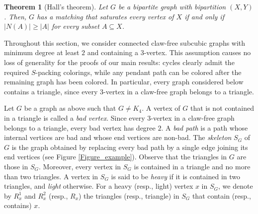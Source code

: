 \documentclass[12pt, oneside]{scrartcl}
\newtheorem{theorem}{Theorem}%
\begin{document}
\begin{theorem}[Hall's theorem]\label{t2}
Let $G$ be a bipartite graph with bipartition $(X,Y)$. Then, $G$ has a matching that saturates every vertex of $X$ if and only if
$|N(A)|\ge |A|$ for every subset $A\subseteq X$.
\end{theorem}

Throughout this section, we consider connected claw-free subcubic graphs with minimum degree at least $2$ and containing a $3$-vertex. This assumption causes no loss of generality for the proofs of our main results: cycles clearly admit the required $S$-packing colorings, while any pendant path can be colored after the remaining graph has been colored. In particular, every graph considered below contains a triangle, since every $3$-vertex in a claw-free graph belongs to a triangle.

Let $G$ be a graph as above such that $G\neq K_4$. A vertex of $G$ that is not contained in a triangle is called a \textit{bad vertex}. Since every $3$-vertex in a claw-free graph belongs to a triangle, every bad vertex has degree $2$. A \textit{bad path} is a path whose internal vertices are bad and whose end vertices are non-bad. The \textit{skeleton} $S_G$ of $G$ is the graph obtained by replacing every bad path by a single edge joining its end vertices (see Figure \ref{Figure_example}). Observe that the triangles in $G$ are those in $S_G$. Moreover, every vertex in $S_G$ is contained in a triangle and no more than two triangles. A vertex in $S_G$ is said to be \textit{heavy} if it is contained in two triangles, and \textit{light} otherwise. For a heavy (resp., light) vertex $x$ in $S_G$, we denote by $R_x^1$ and $R_x^2$ (resp., $R_x$) the triangles (resp., triangle) in $S_G$ that contain (resp., contains) $x$.
\end{document}
